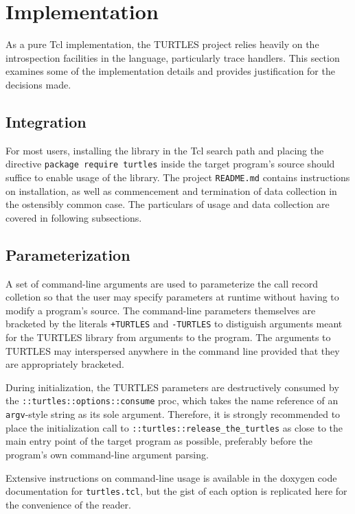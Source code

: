 \documentclass{article}[letter,10pt]
\begin{document}
\section{Implementation}{
  As a pure Tcl implementation, the TURTLES project relies heavily on the
  introspection facilities in the language, particularly trace handlers.
  This section examines some of the implementation details and provides
  justification for the decisions made.

  \subsection{Integration}{
    For most users, installing the library in the Tcl search path and placing
    the directive \texttt{package require turtles} inside the target program's source
    should suffice to enable usage of the library. The project \texttt{README.md} contains
    instructions on installation, as well as commencement and termination of data
    collection in the ostensibly common case. The particulars of usage and data collection
    are covered in following subsections.
  }

  \subsection{Parameterization}{
    A set of command-line arguments are used to parameterize the call record colletion
    so that the user may specify parameters at runtime without having to modify a program's source.
    The command-line parameters themselves are bracketed by the literals \texttt{+TURTLES} and \texttt{-TURTLES}
    to distiguish arguments meant for the TURTLES library from arguments to the program.
    The arguments to TURTLES may interspersed anywhere in the command line provided that
    they are appropriately bracketed.

    During initialization, the TURTLES parameters are destructively consumed by the
    \texttt{::turtles::options::consume} proc, which takes the name reference of an \texttt{argv}-style
    string as its sole argument. Therefore, it is  strongly recommended to place the
    initialization call to \texttt{::turtles::release\_the\_turtles} as close to the main entry point
    of the target program as possible, preferably before the program's own command-line argument parsing.

    Extensive instructions on command-line usage is available in the doxygen code documentation
    for \texttt{turtles.tcl}, but the gist of each option is replicated here for the convenience of the reader.

}}
\end{document}
